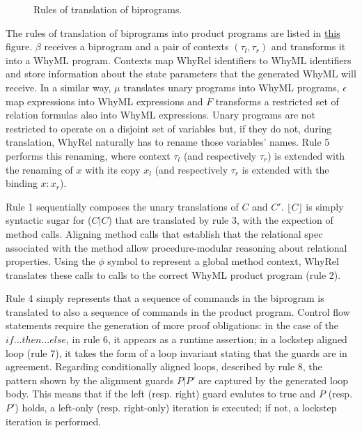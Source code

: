 \begin{figure}[ht]
\begin{minipage}{\linewidth}
  \end{minipage}
  \caption{Rules of translation of biprograms.}
  \label{fig:translation-biprograms-rules}
\end{figure}

The rules of translation of biprograms into product programs are listed in \hyperref[fig:translation-biprograms-rules]{this} figure.
$\beta$ receives a biprogram and a pair of contexts $(\tau_l,\tau_r)$ and transforms it into a WhyML program.
Contexts map WhyRel identifiers to WhyML identifiers and store information about the state parameters that the generated WhyML will receive.
In a similar way, $\mu$ translates unary programs into WhyML programs, $\epsilon$ map expressions into WhyML expressions and $F$ transforms a restricted set of relation formulas also into WhyML expressions.
Unary programs are not restricted to operate on a disjoint set of variables but, if they do not, during translation, WhyRel naturally has to rename those variables' names. 
Rule 5 performs this renaming, where context $\tau_l$ (and respectively $\tau_r$) is extended with the renaming of $x$ with its copy $x_l$ (and respectively $\tau_r$ is extended with the binding $x : x_r$).

Rule 1 sequentially composes the unary translations of $C$ and $C'$.
$\lfloor C \rfloor$ is simply syntactic sugar for ($C|C$) that are translated by rule 3, with the expection of method calls.
Aligning method calls that establish that the relational spec associated with the method allow procedure-modular reasoning about relational properties.
Using the $\phi$ symbol to represent a global method context, WhyRel translates these calls to calls to the correct WhyML product program (rule 2).

Rule 4 simply represents that a sequence of commands in the biprogram is translated to also a sequence of commands in the product program.
Control flow statements require the generation of more proof obligations: in the case of the $if...then...else$, in rule 6, it appears as a runtime assertion; in a lockstep aligned loop (rule 7), it takes the form of a loop invariant stating that the guards are in agreement.
Regarding conditionally aligned loops, described by rule 8, the pattern shown by the alignment guards $P | P'$ are captured by the generated loop body.
This means that if the left (resp. right) guard evalutes to true and $P$ (resp. $P'$) holds, a left-only (resp. right-only) iteration is executed; if not, a lockstep iteration is performed.

